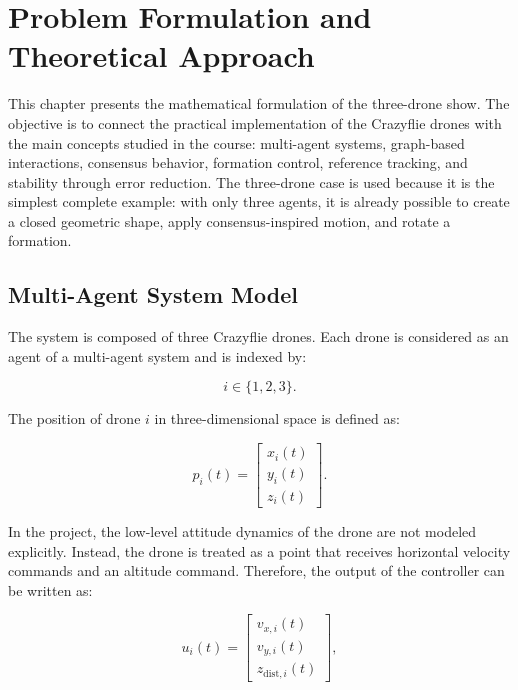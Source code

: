 \chapter{Problem Formulation and Theoretical Approach}
\label{ch:theorie}

This chapter presents the mathematical formulation of the three-drone show. The objective is to connect the practical implementation of the Crazyflie drones with the main concepts studied in the course: multi-agent systems, graph-based interactions, consensus behavior, formation control, reference tracking, and stability through error reduction. The three-drone case is used because it is the simplest complete example: with only three agents, it is already possible to create a closed geometric shape, apply consensus-inspired motion, and rotate a formation.

\section{Multi-Agent System Model}

The system is composed of three Crazyflie drones. Each drone is considered as an agent of a multi-agent system and is indexed by:

\begin{equation}
    i \in \{1,2,3\}.
\end{equation}

The position of drone $i$ in three-dimensional space is defined as:

\begin{equation}
    p_i(t)=
    \begin{bmatrix}
    x_i(t) \\
    y_i(t) \\
    z_i(t)
    \end{bmatrix}.
\end{equation}

In the project, the low-level attitude dynamics of the drone are not modeled explicitly. Instead, the drone is treated as a point that receives horizontal velocity commands and an altitude command. Therefore, the output of the controller can be written as:

\begin{equation}
    u_i(t)=
    \begin{bmatrix}
    v_{x,i}(t) \\
    v_{y,i}(t) \\
    z_{\text{dist},i}(t)
    \end{bmatrix},
\end{equation}

